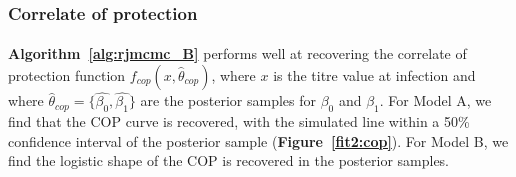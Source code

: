 \subsubsection{Correlate of protection}

\paragraph{} \textbf{Algorithm~\ref{alg:rjmcmc_B}} performs well at recovering the correlate of protection function $f_{cop}(x, \hat{\theta}_{cop})$, where $x$ is the titre value at infection and where $\hat{\theta}_{cop} = \{\hat{\beta_0}, \hat{\beta_1}\}$ are the posterior samples for $\beta_0$ and $\beta_1$. For Model A, we find that the COP curve is recovered, with the simulated line within a 50\% confidence interval of the posterior sample (\textbf{Figure~\ref{fit2:cop}}). For Model B, we find the logistic shape of the COP is recovered in the posterior samples. 

